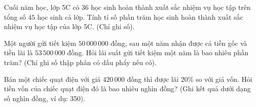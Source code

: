 \begin{ex} %
Cuối năm học, lớp 5C có $36$ học sinh hoàn thành xuất sắc nhiệm vụ học tập trên tổng số $45$ học sinh cả lớp. Tính tỉ số phần trăm học sinh hoàn thành xuất sắc nhiệm vụ học tập của lớp 5C. (Chỉ ghi số).
\end{ex}

\begin{ex} %
Một người gửi tiết kiệm $50\,000\,000$ đồng, sau một năm nhận được cả tiền gốc và tiền lãi là $53\,500\,000$ đồng. Hỏi lãi suất gửi tiết kiệm một năm là bao nhiêu phần trăm? (Chỉ ghi số thập phân có dấu phẩy nếu có).
\end{ex}

\begin{ex} %
Bán một chiếc quạt điện với giá $420\,000$ đồng thì được lãi $20\%$ so với giá vốn. Hỏi tiền vốn của chiếc quạt điện đó là bao nhiêu nghìn đồng? (Ghi kết quả dưới dạng số nghìn đồng, ví dụ: 350).
\end{ex}
